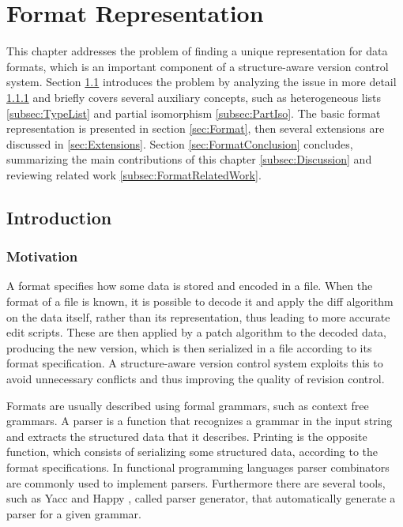 \documentclass[../Thesis.tex]{subfiles}
\begin{document}
\chapter{Format Representation}
\label{chapter:FormatRepresentation}

This chapter addresses the problem of finding a unique representation for data formats, which is an
important component of a structure-aware version control 
system.
Section \ref{sec:FormatIntroduction} introduces the problem by  analyzing the issue in more detail \ref{subsec:FormatMotivation} and briefly covers several auxiliary concepts, such as heterogeneous lists \ref{subsec:TypeList} and partial isomorphism \ref{subsec:PartIso}.
The basic format representation is presented in section \ref{sec:Format}, 
then several extensions are discussed in \ref{sec:Extensions}.
Section \ref{sec:FormatConclusion} concludes, summarizing the main 
contributions of this chapter \ref{subsec:Discussion} 
and reviewing related work \ref{subsec:FormatRelatedWork}.

\section{Introduction}
\label{sec:FormatIntroduction} 
 
\subsection{Motivation}
\label{subsec:FormatMotivation}
A format specifies how some data is stored and encoded in a file.
When the format of a file is known, it is possible to decode it and apply the diff algorithm on the data itself, rather than its representation, thus leading to more accurate edit scripts. These are then applied by a patch algorithm to the decoded data, producing the new version, which is then serialized in a file according to its format specification.
A structure-aware version control system exploits this to
avoid unnecessary conflicts and thus improving 
the quality of revision control.

Formats are usually described using formal grammars, such as context free grammars.
A parser is a function that recognizes a grammar in the input string and extracts the structured data that it describes.
Printing is the opposite function, which consists of serializing some structured data, according to the format specifications.
In functional programming languages parser combinators are commonly used to implement parsers.
Furthermore there are several tools, such as Yacc \cite{YACC} 
and Happy \cite{HAPPY}, called parser generator,
that automatically generate a parser for a given grammar. 
\end{document}
